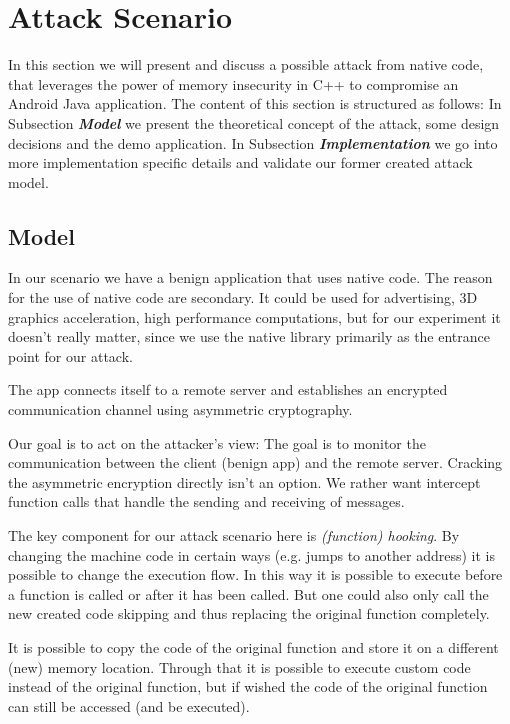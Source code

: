 \section{Attack Scenario}
In this section we will present and discuss a possible attack from native code, that leverages the power of memory insecurity in C++ to compromise an Android Java application. The content of this section is structured as follows: In Subsection \emph{\textbf{Model}} we present the theoretical concept of the attack, some design decisions and the demo application. 
In Subsection \emph{\textbf{Implementation}} we go into more implementation specific details and validate our former created attack model.

\subsection{Model}

In our scenario we have a benign application that uses native code.
The reason for the use of native code are secondary. It could be used for advertising, 3D graphics acceleration, high performance computations, but for our experiment it doesn't really matter, since we use the native library primarily as the entrance point for our attack.

The app connects itself to a remote server and establishes an encrypted communication channel using asymmetric cryptography.
  
Our goal is to act on the attacker's view: The goal is to monitor the communication between the client (benign app) and the remote server. 
Cracking the asymmetric encryption directly isn't an option. We rather want intercept function calls that handle the sending and receiving of messages.

The key component for our attack scenario here is \emph{(function) hooking}.
By changing the machine code in certain ways (e.g. jumps to another address) it is possible to change the execution flow. In this way it is possible to execute before a function is called or after it has been called. But one could also only call the new created code skipping and thus replacing the original function completely. 

It is possible to copy the code of the original function and store it on a different (new) memory location. 
Through that it is possible to execute custom code instead of the original function, but if wished the code of the original function can still be accessed (and be executed).  


